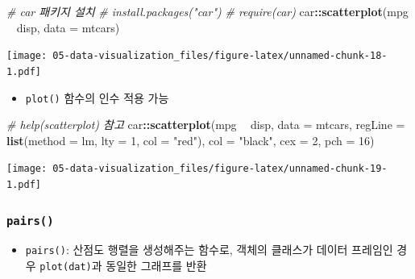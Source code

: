 \documentclass[
  11pt,
]{krantz}
\newenvironment{Shaded}{\begin{snugshade}}{\end{snugshade}}
\newcommand{\CommentTok}[1]{\textcolor[rgb]{0.37,0.37,0.37}{\textit{#1}}}
\newcommand{\DataTypeTok}[1]{\textcolor[rgb]{0.27,0.27,0.27}{#1}}
\newcommand{\DecValTok}[1]{\textcolor[rgb]{0.06,0.06,0.06}{#1}}
\newcommand{\KeywordTok}[1]{\textcolor[rgb]{0.27,0.27,0.27}{\textbf{#1}}}
\newcommand{\NormalTok}[1]{#1}
\newcommand{\OperatorTok}[1]{\textcolor[rgb]{0.43,0.43,0.43}{\textbf{#1}}}
\newcommand{\StringTok}[1]{\textcolor[rgb]{0.5,0.5,0.5}{#1}}
\providecommand{\tightlist}{%
  \setlength{\itemsep}{0pt}\setlength{\parskip}{0pt}}
\begin{document}
\footnotesize

\begin{Shaded}
\begin{Highlighting}[]
\CommentTok{# car 패키지 설치}
\CommentTok{# install.packages("car")}
\CommentTok{# require(car)}
\NormalTok{car}\OperatorTok{::}\KeywordTok{scatterplot}\NormalTok{(mpg }\OperatorTok{~}\StringTok{ }\NormalTok{disp, }\DataTypeTok{data =}\NormalTok{ mtcars)}
\end{Highlighting}
\end{Shaded}

\texttt{[image: 05-data-visualization\_files/figure-latex/unnamed-chunk-18-1.pdf]}

\normalsize

\begin{itemize}
\tightlist
\item
  \texttt{plot()} 함수의 인수 적용 가능
\end{itemize}

\footnotesize

\begin{Shaded}
\begin{Highlighting}[]
\CommentTok{# help(scatterplot) 참고}
\NormalTok{car}\OperatorTok{::}\KeywordTok{scatterplot}\NormalTok{(mpg }\OperatorTok{~}\StringTok{ }\NormalTok{disp, }\DataTypeTok{data =}\NormalTok{ mtcars, }
                 \DataTypeTok{regLine =} \KeywordTok{list}\NormalTok{(}\DataTypeTok{method =}\NormalTok{ lm, }\DataTypeTok{lty =} \DecValTok{1}\NormalTok{, }\DataTypeTok{col =} \StringTok{"red"}\NormalTok{), }
                 \DataTypeTok{col =} \StringTok{"black"}\NormalTok{, }\DataTypeTok{cex =} \DecValTok{2}\NormalTok{, }\DataTypeTok{pch =} \DecValTok{16}\NormalTok{)}
\end{Highlighting}
\end{Shaded}

\texttt{[image: 05-data-visualization\_files/figure-latex/unnamed-chunk-19-1.pdf]}

\normalsize

\hypertarget{pairs}{%
\subsubsection{\texorpdfstring{\textbf{\texttt{pairs()}}}{pairs()}}\label{pairs}}

\begin{itemize}
\tightlist
\item
  \texttt{pairs()}: 산점도 행렬을 생성해주는 함수로, 객체의 클래스가 데이터 프레임인 경우 \texttt{plot(dat)}과 동일한 그래프를 반환
\end{itemize}
\end{document}
